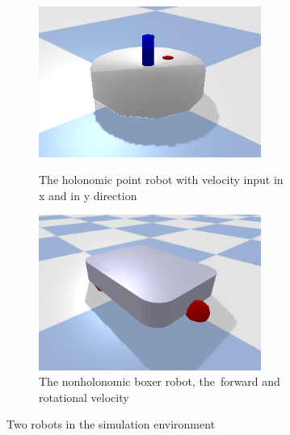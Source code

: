 \begin{figure}[H]
    \centering
    \begin{subfigure}{.5\textwidth}
    \centering
    \includegraphics[width=0.8\textwidth]{figures/introduction/point_robot.png}
    \caption{The holonomic point robot with velocity input in \\\gls{x} and in \gls{y} direction}%
    \label{subfig:example_point_robot}
    \end{subfigure}%
    \begin{subfigure}{.5\textwidth}
    \centering
    \includegraphics[width=0.8\textwidth]{figures/introduction/boxer_robot.png}
    \caption{The nonholonomic boxer robot, the\ forward and rotational velocity}%
    \label{subfig:example_boxer_robot}
    \end{subfigure}%
    \caption{Two robots in the simulation environment}%
    \label{fig:example_robots}
\end{figure}

